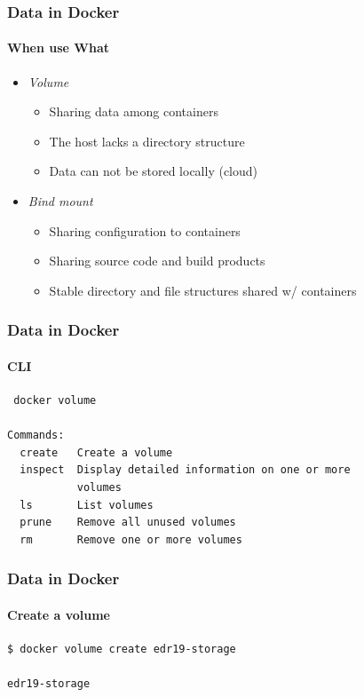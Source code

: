 

\begin{frame}[fragile]
\frametitle{Data in Docker}
\framesubtitle{When use What}

\begin{itemize}
\item \textit{Volume}
  \begin{itemize}
  \item Sharing data among containers
  \item The host lacks a directory structure
  \item Data can not be stored locally (cloud)
  \end{itemize}
\item \textit{Bind mount}
  \begin{itemize}
  \item Sharing configuration to containers
  \item Sharing source code and build products
  \item Stable directory and file structures shared w/ containers
  \end{itemize}
\end{itemize}
\end{frame}

\begin{frame}[fragile]
\frametitle{Data in Docker}
\framesubtitle{CLI}

\begin{lstlisting}
 docker volume

Commands:
  create   Create a volume
  inspect  Display detailed information on one or more
           volumes
  ls       List volumes
  prune    Remove all unused volumes
  rm       Remove one or more volumes
\end{lstlisting}
\end{frame}


\begin{frame}[fragile]
\frametitle{Data in Docker}
\framesubtitle{Create a volume}

\begin{lstlisting}
$ docker volume create edr19-storage

edr19-storage
\end{lstlisting}
\end{frame}

